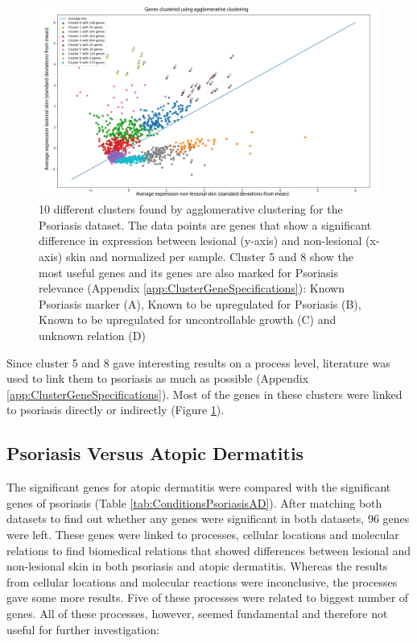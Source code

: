 \documentclass[10pt,a4paper]{article}
\begin{document}
	\begin{figure}[H]
		\includegraphics[width=\textwidth]{Cluster_Results.png}
	
		\caption{10 different clusters found by agglomerative clustering for the Psoriasis dataset. The data points are genes that show a significant difference in expression between lesional (y-axis) and non-lesional (x-axis) skin and normalized per sample. Cluster 5 and 8 show the most useful genes and its genes are also marked for Psoriasis relevance (Appendix \ref{app:ClusterGeneSpecifications}): Known Psoriasis marker (A), Known to be upregulated for Psoriasis (B), Known to be upregulated for uncontrollable growth (C) and unknown relation (D)}
		\label{fig:ClusteredGenes}
	\end{figure}
	
	Since cluster 5 and 8 gave interesting results on a process level, literature was used to link them to psoriasis as much as possible (Appendix \ref{app:ClusterGeneSpecifications}). Most of the genes in these clusters were linked to psoriasis directly or indirectly (Figure \ref{fig:ClusteredGenes}).
	
	\subsection{Psoriasis Versus Atopic Dermatitis}
	\label{subsec:ResultsPsoriasisVersusAtopicDermatitis}
	
	The significant genes for atopic dermatitis were compared with the significant genes of psoriasis (Table \ref{tab:ConditionsPsoriasisAD}). After matching both datasets to find out whether any genes were significant in both datasets, 96 genes were left. These genes were linked to processes, cellular locations and molecular relations to find biomedical relations that showed differences between lesional and non-lesional skin in both psoriasis and atopic dermatitis. Whereas the results from cellular locations and molecular reactions were inconclusive, the processes gave some more results. Five of these processes were related to biggest number of genes. All of these processes, however, seemed fundamental and therefore not useful for further investigation:
	
\end{document}
